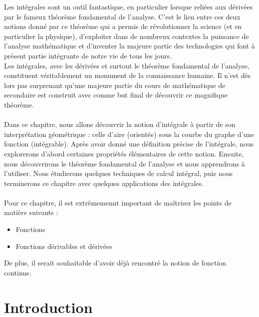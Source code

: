 \documentclass[a4paper,fontsize=13pt]{scrreprt}
\theoremstyle{plain}
\theoremstyle{definition}
\begin{document}
\newpage
Les intégrales sont un outil fantastique, en particulier lorsque reliées aux dérivées par le fameux théorème fondamental de l'analyse. C'est le lien entre ces deux notions donné par ce théorème qui a permis de révolutionner la science (et en particulier la physique), d'exploiter dans de nombreux contextes la puissance de l'analyse mathématique et d'inventer la majeure partie des technologies qui font à présent partie intégrante de notre vie de tous les jours. \\
Les intégrales, avec les dérivées et surtout le théorème fondamental de l'analyse, constituent véritablement un monument de la connaissance humaine. Il n'est dès lors pas surprenant qu'une majeure partie du cours de mathématique de secondaire est construit avec comme but final de découvrir ce magnifique théorème. \\
~\\
Dans ce chapitre, nous allons découvrir la notion d'intégrale à partir de son interprétation géométrique : celle d'aire (orientée) sous la courbe du graphe d'une fonction (intégrable). Après avoir donné une définition précise de l'intégrale, nous explorerons d'abord certaines propriétés élémentaires de cette notion. Ensuite, nous découvrirons le théorème fondamental de l'analyse et nous apprendrons à l'utiliser. Nous étudierons quelques techniques de calcul intégral, puis nous terminerons ce chapitre avec quelques applications des intégrales.\\
~\\
Pour ce chapitre, il est extrêmemennt important de maîtriser les points de matière suivants :
\begin{itemize}
\item Fonctions
\item Fonctions dérivables et dérivées
\end{itemize}
De plus, il serait souhaitable d'avoir déjà rencontré la notion de fonction continue.
\newpage

\chapter{Introduction}
\end{document}
